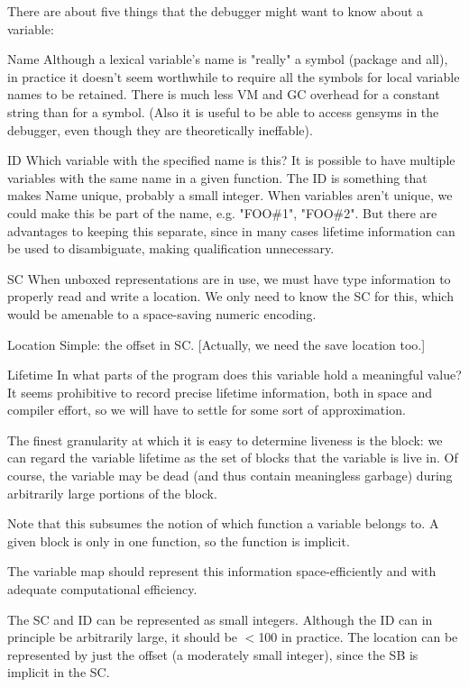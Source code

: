 There are about five things that the debugger might want to know about a
variable:

    Name
	Although a lexical variable's name is "really" a symbol (package and
	all), in practice it doesn't seem worthwhile to require all the symbols
	for local variable names to be retained.  There is much less VM and GC
	overhead for a constant string than for a symbol.  (Also it is useful
	to be able to access gensyms in the debugger, even though they are
	theoretically ineffable).

    ID
	Which variable with the specified name is this?  It is possible to have
	multiple variables with the same name in a given function.  The ID is
	something that makes Name unique, probably a small integer.  When
	variables aren't unique, we could make this be part of the name, e.g.
	"FOO\#1", "FOO\#2".  But there are advantages to keeping this separate,
	since in many cases lifetime information can be used to disambiguate,
	making qualification unnecessary.

    SC
	When unboxed representations are in use, we must have type information
	to properly read and write a location.  We only need to know the
	SC for this, which would be amenable to a space-saving
	numeric encoding.

    Location
	Simple: the offset in SC.  [Actually, we need the save location too.]

    Lifetime
	In what parts of the program does this variable hold a meaningful
	value?  It seems prohibitive to record precise lifetime information,
	both in space and compiler effort, so we will have to settle for some
	sort of approximation.

	The finest granularity at which it is easy to determine liveness is
	the block: we can regard the variable lifetime as the set of blocks
	that the variable is live in.  Of course, the variable may be dead (and
	thus contain meaningless garbage) during arbitrarily large portions of
	the block.

	Note that this subsumes the notion of which function a variable belongs
	to.  A given block is only in one function, so the function is
	implicit.


The variable map should represent this information space-efficiently and with
adequate computational efficiency.

The SC and ID can be represented as small integers.  Although the ID can in
principle be arbitrarily large, it should be $<$100 in practice.  The location
can be represented by just the offset (a moderately small integer), since the
SB is implicit in the SC.

